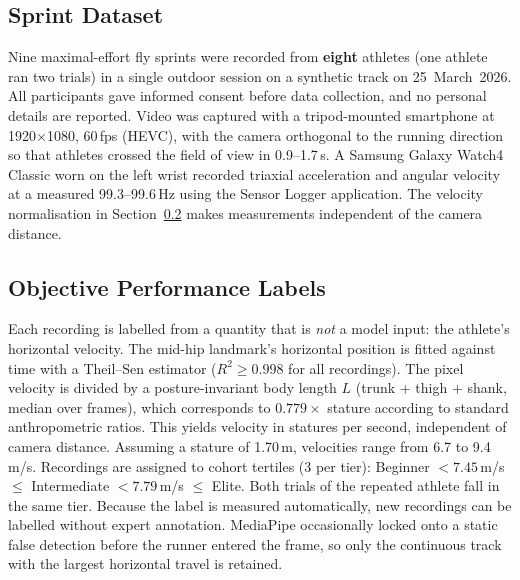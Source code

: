 \subsection{Sprint Dataset}
Nine maximal-effort fly sprints were recorded from \textbf{eight} athletes (one
athlete ran two trials) in a single outdoor session on a synthetic track on
25~March~2026. All participants gave informed consent before data collection, and
no personal details are reported. Video was captured with a tripod-mounted
smartphone at 1920$\times$1080, 60\,fps (HEVC), with the camera orthogonal to the
running direction so that athletes crossed the field of view in 0.9--1.7\,s.
A Samsung Galaxy Watch4 Classic worn on the left wrist
recorded triaxial acceleration and angular velocity at a measured
99.3--99.6\,Hz using the Sensor Logger application. The velocity
normalisation in Section~\ref{sec:labels} makes measurements independent of the
camera distance.

\subsection{Objective Performance Labels}\label{sec:labels}
Each recording is labelled from a quantity that is \emph{not} a model input:
the athlete's horizontal velocity. The mid-hip landmark's horizontal position
is fitted against time with a Theil--Sen estimator ($R^2\geq0.998$ for all
recordings). The pixel velocity is divided by a posture-invariant body length
$L$ (trunk + thigh + shank, median over frames), which corresponds to
$0.779\times$ stature according to standard anthropometric ratios. This yields
velocity in statures per second, independent of camera distance. Assuming a
stature of 1.70\,m, velocities range from 6.7 to 9.4\,m/s. Recordings are
assigned to cohort tertiles (3 per tier): Beginner $<7.45$\,m/s $\leq$
Intermediate $<7.79$\,m/s $\leq$ Elite. Both trials of the repeated athlete
fall in the same tier. Because the label is measured automatically, new
recordings can be labelled without expert annotation. MediaPipe occasionally
locked onto a static false detection before the runner entered the frame, so
only the continuous track with the largest horizontal travel is retained.

